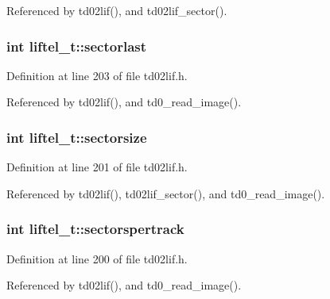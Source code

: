 Referenced by td02lif(), and td02lif\+\_\+sector().

\subsubsection[{\texorpdfstring{sectorlast}{sectorlast}}]{\setlength{\rightskip}{0pt plus 5cm}int liftel\+\_\+t\+::sectorlast}\hypertarget{structliftel__t_aae9fb3e37531df4dfdf0b2906ec95026}{}\label{structliftel__t_aae9fb3e37531df4dfdf0b2906ec95026}


Definition at line 203 of file td02lif.\+h.



Referenced by td02lif(), and td0\+\_\+read\+\_\+image().

\subsubsection[{\texorpdfstring{sectorsize}{sectorsize}}]{\setlength{\rightskip}{0pt plus 5cm}int liftel\+\_\+t\+::sectorsize}\hypertarget{structliftel__t_aaf7b830b7b2791c56c83082bb9dba7d9}{}\label{structliftel__t_aaf7b830b7b2791c56c83082bb9dba7d9}


Definition at line 201 of file td02lif.\+h.



Referenced by td02lif(), td02lif\+\_\+sector(), and td0\+\_\+read\+\_\+image().

\subsubsection[{\texorpdfstring{sectorspertrack}{sectorspertrack}}]{\setlength{\rightskip}{0pt plus 5cm}int liftel\+\_\+t\+::sectorspertrack}\hypertarget{structliftel__t_a69b69f0cd2e8f0017178bafd5a7a7585}{}\label{structliftel__t_a69b69f0cd2e8f0017178bafd5a7a7585}


Definition at line 200 of file td02lif.\+h.



Referenced by td02lif(), and td0\+\_\+read\+\_\+image().


